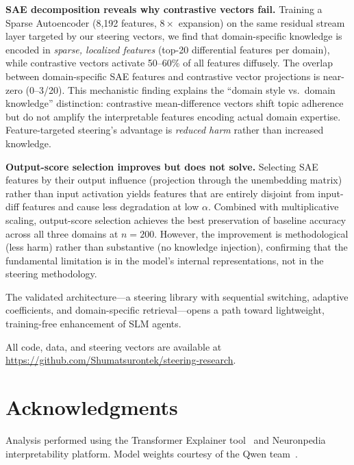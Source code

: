 \documentclass[11pt,a4paper]{article}
\begin{document}
\textbf{SAE decomposition reveals why contrastive vectors fail.} Training a Sparse Autoencoder (8{,}192 features, $8\times$ expansion) on the same residual stream layer targeted by our steering vectors, we find that domain-specific knowledge is encoded in \textit{sparse, localized features} (top-20 differential features per domain), while contrastive vectors activate 50--60\% of all features diffusely. The overlap between domain-specific SAE features and contrastive vector projections is near-zero (0--3/20). This mechanistic finding explains the ``domain style vs.\ domain knowledge'' distinction: contrastive mean-difference vectors shift topic adherence but do not amplify the interpretable features encoding actual domain expertise. Feature-targeted steering's advantage is \textit{reduced harm} rather than increased knowledge.

\textbf{Output-score selection improves but does not solve.} Selecting SAE features by their output influence (projection through the unembedding matrix) rather than input activation yields features that are entirely disjoint from input-diff features and cause less degradation at low $\alpha$. Combined with multiplicative scaling, output-score selection achieves the best preservation of baseline accuracy across all three domains at $n=200$. However, the improvement is methodological (less harm) rather than substantive (no knowledge injection), confirming that the fundamental limitation is in the model's internal representations, not in the steering methodology.

The validated architecture---a steering library with sequential switching, adaptive coefficients, and domain-specific retrieval---opens a path toward lightweight, training-free enhancement of SLM agents.

All code, data, and steering vectors are available at \url{https://github.com/Shumatsurontek/steering-research}.

\section*{Acknowledgments}
Analysis performed using the Transformer Explainer tool~\cite{cho2024transformer} and Neuronpedia interpretability platform. Model weights courtesy of the Qwen team~\cite{qwen3}.
\end{document}
